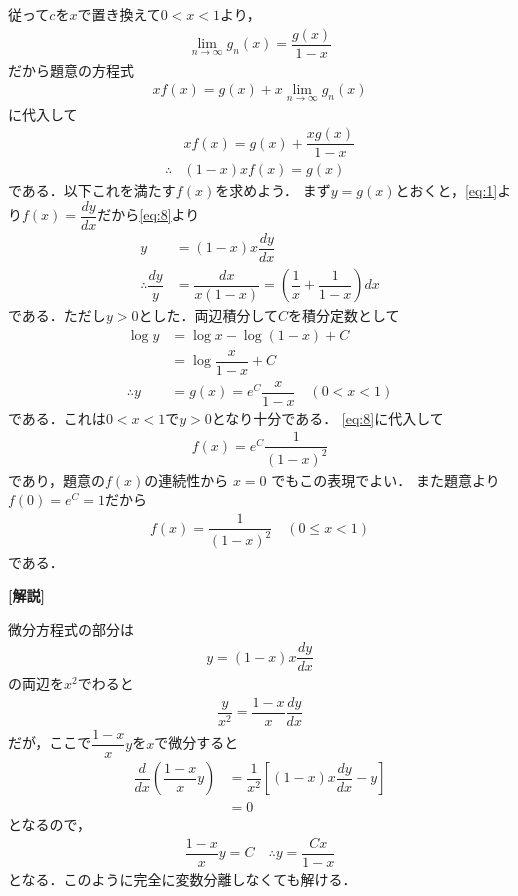 \documentclass[../../main.tex]{subfiles}
\begin{document}
従って$c$を$x$で置き換えて$0<x<1$より，
\begin{align}
  \lim_{n\to\infty}g_{n}(x) = \dfrac{g(x)}{1-x} \label{eq:6}
\end{align}
だから題意の方程式
\begin{align}
  xf(x) = g(x) + x\lim_{n\to\infty}g_{n}(x) \label{eq:7}
\end{align}
に代入して
\begin{align}
  &xf(x) = g(x) + \dfrac{xg(x)}{1-x} \\
  \therefore
  &(1-x)x f(x) = g(x) \label{eq:8}
\end{align}
である．以下これを満たす$f(x)$を求めよう．
まず$y=g(x)$とおくと，\cref{eq:1}より$f(x)=\dfrac{dy}{dx}$だから\cref{eq:8}より
\begin{align}
  y &= (1-x)x \dfrac{dy}{dx} \\
  \therefore
  \dfrac{dy}{y} &= \dfrac{dx}{x(1-x)} = \left(\dfrac{1}{x}+\dfrac{1}{1-x}\right)dx
\end{align}
である．ただし$y>0$とした．両辺積分して$C$を積分定数として
\begin{align}
  \log y
  &= \log x - \log (1-x) + C \\
  &= \log \dfrac{x}{1-x} + C \\
  \therefore
  y&=g(x) = e^{C}\dfrac{x}{1-x} \quad (0<x<1) \label{eq:9}
\end{align}
である．これは$0<x<1$で$y>0$となり十分である．
\cref{eq:8}に代入して
\begin{align}
  f(x) = e^{C}\dfrac{1}{(1-x)^2}
\end{align}
であり，題意の$f(x)$の連続性から $x=0$ でもこの表現でよい．
また題意より$f(0)=e^{C}=1$だから
\begin{align}
  f(x) = \dfrac{1}{(1-x)^2} \quad (0\le x<1) \label{eq:10}
\end{align}
である．

{\bf [解説]}

微分方程式の部分は
\begin{align}
  y = (1-x)x \dfrac{dy}{dx}
\end{align}
の両辺を$x^2$でわると
\begin{align}
  \dfrac{y}{x^2} = \dfrac{1-x}{x}\dfrac{dy}{dx}
\end{align}
だが，ここで$\dfrac{1-x}{x}y$を$x$で微分すると
\begin{align}
  \dfrac{d}{dx}\left(\dfrac{1-x}{x}y\right)
  &= \dfrac{1}{x^2}\left[(1-x)x\dfrac{dy}{dx}-y\right] \\
  &= 0
\end{align}
となるので，
\begin{align}
  \dfrac{1-x}{x}y = C
  \quad\therefore
  y = \dfrac{Cx}{1-x}
\end{align}
となる．このように完全に変数分離しなくても解ける．

\newpage
\end{document}
